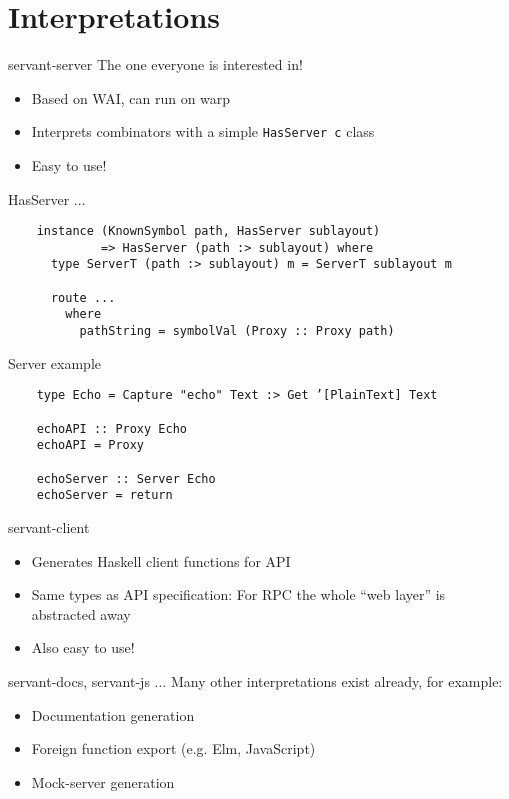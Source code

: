 \documentclass[12pt]{beamer}
\begin{document}
\section{Interpretations}

\begin{frame}{servant-server}
  The one everyone is interested in!

  \begin{itemize}
  \item Based on WAI, can run on warp
  \item Interprets combinators with a simple \texttt{HasServer c} class
  \item Easy to use!
  \end{itemize}
\end{frame}

\begin{frame}[fragile]{HasServer ...}
  \begin{verbatim}
    instance (KnownSymbol path, HasServer sublayout)
             => HasServer (path :> sublayout) where
      type ServerT (path :> sublayout) m = ServerT sublayout m

      route ...
        where
          pathString = symbolVal (Proxy :: Proxy path)
  \end{verbatim}
\end{frame}

\begin{frame}[fragile]{Server example}
  \begin{verbatim}
    type Echo = Capture "echo" Text :> Get ’[PlainText] Text

    echoAPI :: Proxy Echo
    echoAPI = Proxy

    echoServer :: Server Echo
    echoServer = return
  \end{verbatim}
\end{frame}

\begin{frame}{servant-client}
  \begin{itemize}
  \item Generates Haskell client functions for API
  \item Same types as API specification: For RPC the whole ``web layer'' is abstracted away
  \item Also easy to use!
  \end{itemize}
\end{frame}

\begin{frame}{servant-docs, servant-js ...}
  Many other interpretations exist already, for example:
  \begin{itemize}
  \item Documentation generation
  \item Foreign function export (e.g. Elm, JavaScript)
  \item Mock-server generation
  \end{itemize}
\end{frame}
\end{document}
